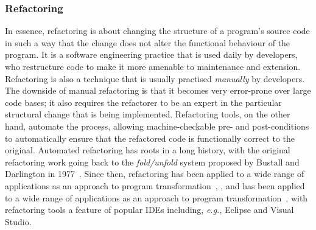 \documentclass[a4paper,11pt]{article}
\begin{document}


\subsubsection{Refactoring}

In essence, refactoring is about changing the structure of a program's source code in such a way that the change does not alter the functional behaviour of the program. It is a software engineering practice that is used daily by developers, who restructure code to make it more amenable to maintenance and extension. Refactoring is also a technique that is usually practised \emph{manually} by developers. The downside of manual refactoring is that it becomes very error-prone over large code bases; it also requires the refactorer to be an expert in the particular structural change that is being implemented. Refactoring tools, on the other hand, automate the process, allowing machine-checkable pre- and post-conditions to automatically ensure that the refactored code is functionally correct to the original. 
%
Automated refactoring has roots in a long history, with the original refactoring work going back to the \emph{fold/unfold} system proposed by Bustall and Darlington in 1977~\cite{darlington77}. Since then, refactoring has been applied to a wide range of applications as an approach to program transformation~\cite{Mens:2004:SSR:972215.972286}, , and has been applied to a wide range of applications as an approach to program transformation~\cite{mens_refactoring}, with refactoring tools a feature of popular IDEs including, \textit{e.g.}, Eclipse and Visual Studio.
\end{document}
